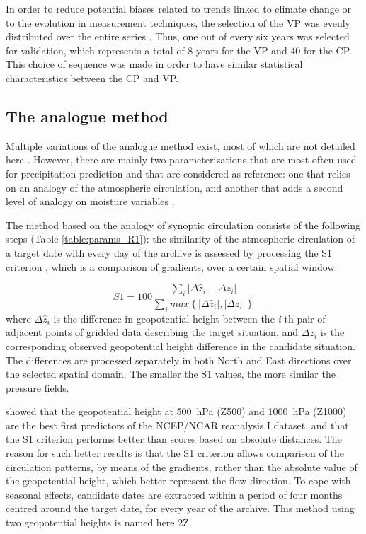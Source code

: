 \documentclass[review]{elsarticle}
\begin{document}
In order to reduce potential biases related to trends linked to climate change or to the evolution in measurement techniques, the selection of the VP was evenly distributed over the entire series \citep{BenDaoud2010}. Thus, one out of every six years was selected for validation, which represents a total of 8 years for the VP and 40 for the CP. This choice of sequence was made in order to have similar statistical characteristics between the CP and VP.


\subsection{The analogue method}
\label{sec:references}

Multiple variations of the analogue method exist, most of which are not detailed here \cite[see][for a more comprehensive listing]{BenDaoud2016}. However, there are mainly two parameterizations that are most often used for precipitation prediction and that are considered as reference: one that relies on an analogy of the atmospheric circulation, and another that adds a second level of analogy on moisture variables \citep{Obled2002, Bontron2005, Marty2012}.

The method based on the analogy of synoptic circulation consists of the following steps (Table \ref{table:params_R1}): the similarity of the atmospheric circulation of a target date with every day of the archive is assessed by processing the S1 criterion \citep[Eq.\ \ref{eq:S1}, ][]{Teweles1954, Drosdowsky2003}, which is a comparison of gradients, over a certain spatial window:

\begin{equation}
\label{eq:S1}
S1=100 \frac {\displaystyle \sum_{i} \vert \Delta\hat{z}_{i} - \Delta z_{i} \vert}
{\displaystyle \sum_{i} max\left\lbrace \vert \Delta\hat{z}_{i} \vert , \vert \Delta z_{i} \vert \right\rbrace }
\end{equation}
where $\Delta \hat{z}_{i}$ is the difference in geopotential height between the \textit{i}-th pair of adjacent points of gridded data describing the target situation, and $\Delta z_{i}$ is the corresponding observed geopotential height difference in the candidate situation. The differences are processed separately in both North and East directions over the selected spatial domain. The smaller the S1 values, the more similar the pressure fields.

\citet{Bontron2005} showed that the geopotential height at 500~hPa (Z500) and 1000~hPa (Z1000) are the best first predictors of the NCEP/NCAR reanalysis I dataset, and that the S1 criterion performs better than scores based on absolute distances. The reason for such better results is that the S1 criterion allows comparison of the circulation patterns, by means of the gradients, rather than the absolute value of the geopotential height, which better represent the flow direction. To cope with seasonal effects, candidate dates are extracted within a period of four months centred around the target date, for every year of the archive. This method using two geopotential heights is named here 2Z.
\end{document}
